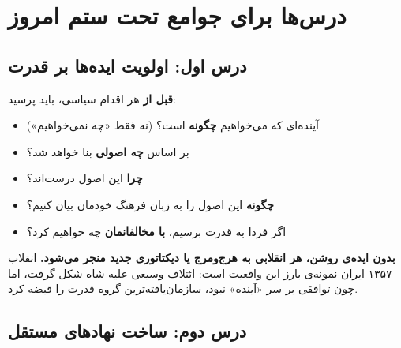 \section{درس‌ها برای جوامع تحت ستم امروز}
\label{sec:ch16-lessons}

\subsection{درس اول: اولویت ایده‌ها بر قدرت}

\begin{tcolorbox}[legalbox, title={ایده‌سازی}]
\textbf{قبل از} هر اقدام سیاسی، باید پرسید:
\begin{itemize}
\item آینده‌ای که می‌خواهیم \textbf{چگونه} است؟ (نه فقط «چه نمی‌خواهیم»)
\item بر اساس \textbf{چه اصولی} بنا خواهد شد؟
\item \textbf{چرا} این اصول درست‌اند؟
\item \textbf{چگونه} این اصول را به زبان فرهنگ خودمان بیان کنیم؟
\item اگر فردا به قدرت برسیم، \textbf{با مخالفانمان} چه خواهیم کرد؟
\end{itemize}

\textbf{بدون ایده‌ی روشن، هر انقلابی به هرج‌ومرج یا دیکتاتوری جدید منجر
می‌شود.} انقلاب ۱۳۵۷ ایران نمونه‌ی بارز این واقعیت است: ائتلاف وسیعی
علیه شاه شکل گرفت، اما چون توافقی بر سر «آینده» نبود، سازمان‌یافته‌ترین
گروه قدرت را قبضه کرد.
\end{tcolorbox}


\subsection{درس دوم: ساخت نهادهای مستقل}

